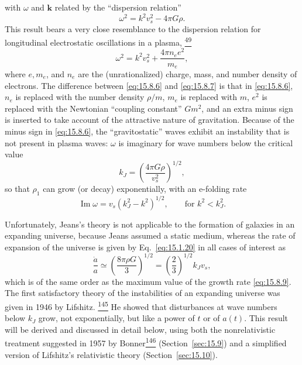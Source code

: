 with \(\omega\) and \(\mathbf k\) related by the ``dispersion relation''
\begin{equation}
  \omega^2=k^2v_s^2-4\pi G\rho.
  \tag{15.8.6}\label{eq:15.8.6}
\end{equation}
This result bears a very close resemblance to the dispersion relation for
longitudinal electrostatic oscillations in a plasma,%
\hyperref[ch15-ref-49]{\textsuperscript{49}}
\begin{equation}
  \omega^2
  =
  k^2v_s^2+\frac{4\pi n_e e^2}{m_e},
  \tag{15.8.7}\label{eq:15.8.7}
\end{equation}
where \(e,m_e\), and \(n_e\) are the (unrationalized) charge, mass, and number
density of electrons. The difference between \eqref{eq:15.8.6} and
\eqref{eq:15.8.7} is that in \eqref{eq:15.8.6}, \(n_e\) is replaced with
the number density \(\rho/m\), \(m_e\) is replaced with \(m\), \(e^2\) is
replaced with the Newtonian ``coupling constant'' \(Gm^2\), and an extra
minus sign is inserted to take account of the attractive nature of
gravitation. Because of the minus sign in \eqref{eq:15.8.6}, the
``gravitostatic'' waves exhibit an instability that is not present in plasma
waves: \(\omega\) is imaginary for wave numbers below the critical value
\begin{equation}
  k_J
  =
  \left(\frac{4\pi G\rho}{v_s^2}\right)^{1/2},
  \tag{15.8.8}\label{eq:15.8.8}
\end{equation}
so that \(\rho_1\) can grow (or decay) exponentially, with an e-folding rate
\begin{equation}
  \operatorname{Im}\omega
  =
  v_s(k_J^2-k^2)^{1/2},
  \qquad
  \text{for \(k^2<k_J^2\)}.
  \tag{15.8.9}\label{eq:15.8.9}
\end{equation}

Unfortunately, Jeans's theory is not applicable to the formation of galaxies
in an expanding universe, because Jeans assumed a static medium, whereas the
rate of expansion of the universe is given by Eq.~\eqref{eq:15.1.20} in all
cases of interest as
\begin{equation}
  \frac{\dot a}{a}
  \simeq
  \left(\frac{8\pi\rho G}{3}\right)^{1/2}
  =
  \left(\frac23\right)^{1/2}k_Jv_s,
  \tag{15.8.10}\label{eq:15.8.10}
\end{equation}
which is of the same order as the maximum value of the growth rate
\eqref{eq:15.8.9}. The first satisfactory theory of the instabilities of an
expanding universe was given in 1946 by Lifshitz.%
\hyperref[ch15-ref-145]{\textsuperscript{145}} He showed that disturbances
at wave numbers below \(k_J\) grow, not exponentially, but like a power of
\(t\) or of \(a(t)\). This result will be derived and discussed in detail
below, using both the nonrelativistic treatment suggested in 1957 by
Bonner\hyperref[ch15-ref-146]{\textsuperscript{146}} (Section~\ref{sec:15.9})
and a simplified version of Lifshitz's relativistic theory
(Section~\ref{sec:15.10}).

